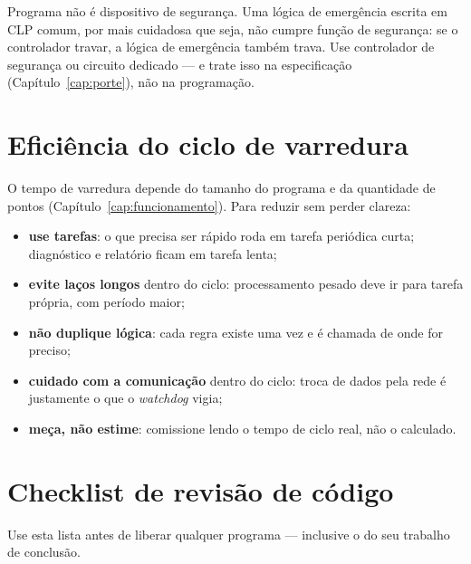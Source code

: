 \begin{atencao}
Programa não é dispositivo de segurança. Uma lógica de emergência escrita em CLP comum, por mais
cuidadosa que seja, não cumpre função de segurança: se o controlador travar, a lógica de emergência
também trava. Use controlador de segurança ou circuito dedicado --- e trate isso na especificação
(Capítulo~\ref{cap:porte}), não na programação.
\end{atencao}

\section{Eficiência do ciclo de varredura}

O tempo de varredura depende do tamanho do programa e da quantidade de pontos
(Capítulo~\ref{cap:funcionamento}). Para reduzir sem perder clareza:

\begin{itemize}
  \item \textbf{use tarefas}: o que precisa ser rápido roda em tarefa periódica curta; diagnóstico e
        relatório ficam em tarefa lenta;
  \item \textbf{evite laços longos} dentro do ciclo: processamento pesado deve ir para tarefa
        própria, com período maior;
  \item \textbf{não duplique lógica}: cada regra existe uma vez e é chamada de onde for preciso;
  \item \textbf{cuidado com a comunicação} dentro do ciclo: troca de dados pela rede é justamente o
        que o \emph{watchdog} vigia;
  \item \textbf{meça, não estime}: comissione lendo o tempo de ciclo real, não o calculado.
\end{itemize}

\section{Checklist de revisão de código}

Use esta lista antes de liberar qualquer programa --- inclusive o do seu trabalho de conclusão.

